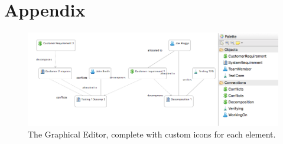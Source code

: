 \documentclass{article}
\begin{document}
\section{Appendix}

\begin{figure}[h]
\includegraphics[width=\textwidth]{graphical_editor}
\caption{The Graphical Editor, complete with custom icons for each element.}
\label{fig:graph_editor}
\end{figure}
\end{document}
